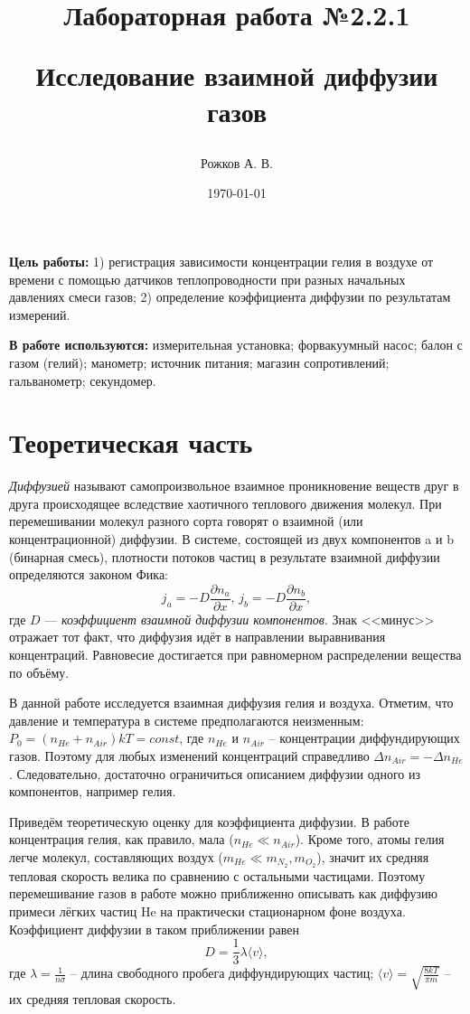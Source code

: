 \documentclass[a4paper, 12pt]{article}
\title{\begin{center}Лабораторная работа №2.2.1\end{center}
Исследование взаимной диффузии газов}
\author{Рожков А. В.}
\date{\today}
\begin{document}
    \maketitle
    \newpage

    \textbf{Цель работы:} 1) регистрация зависимости концентрации гелия в воздухе от времени с помощью датчиков теплопроводности при разных начальных давлениях смеси газов; 2) определение коэффициента диффузии по результатам измерений.

    \textbf{В работе используются:} измерительная установка; форвакуумный насос; балон с газом  (гелий); манометр; источник питания; магазин сопротивлений; гальванометр; секундомер.


    \section{Теоретическая часть}
        \textit{Диффузией}  называют самопроизвольное взаимное проникновение веществ друг в друга происходящее вследствие хаотичного теплового движения молекул. При перемешивании молекул разного сорта говорят о взаимной (или концентрационной) диффузии. В системе, состоящей из двух компонентов a и b (бинарная смесь), плотности потоков частиц в результате взаимной диффузии определяются законом Фика:
        \begin{equation}
            j_a = -D \frac{\partial n_a}{\partial x}, \, j_b = -D \frac{\partial n_b}{\partial x},
        \end{equation}
        где $D$ — \textit{коэффициент взаимной диффузии компонентов}. Знак <<минус>> отражает тот факт, что диффузия идёт в направлении выравнивания концентраций. Равновесие достигается при равномерном распределении вещества по объёму.

        В данной работе исследуется взаимная диффузия гелия и воздуха. Отметим, что давление и температура в системе предполагаются неизменным: $P_0 = (n_{He}+n_{Air})kT = const$, где $n_{He}$  и $n_{Air}$ -- концентрации диффундирующих газов. Поэтому для любых изменений концентраций справедливо $\Delta n_{Air} = -\Delta n_{He}$. Следовательно, достаточно ограничиться описанием диффузии одного из компонентов, например гелия.

        Приведём теоретическую оценку для коэффициента диффузии. В работе концентрация гелия, как правило, мала ($n_{He} \ll n_{Air}$). Кроме того, атомы гелия легче молекул, составляющих воздух ($m_{He} \ll m_{N_2}, m_{O_2}$), значит их средняя тепловая скорость велика по сравнению с остальными частицами. Поэтому перемешивание газов в работе можно приближенно описывать как диффузию примеси лёгких частиц He на практически стационарном фоне воздуха. Коэффициент диффузии в таком приближении равен
        \begin{equation}
            \label{D}
            D = \frac{1}{3} \lambda \langle v \rangle,
        \end{equation}
        где $\lambda = \frac{1}{n\sigma}$ -- длина свободного пробега диффундирующих частиц; $\langle v \rangle = \sqrt{\frac{8kT}{\pi m}}$ -- их средняя тепловая скорость.
\end{document}
